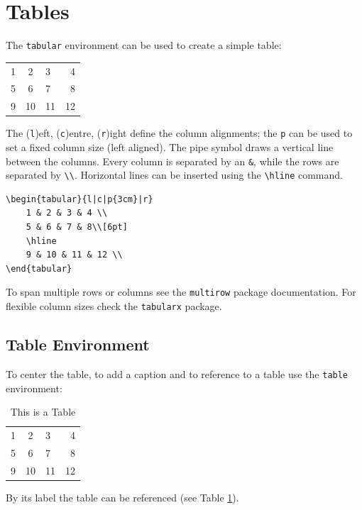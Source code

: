 \section{Tables}

The \texttt{tabular} environment can be used to create a simple table:
\begin{tabular}{l|c|p{3cm}|r}
    1 & 2 & 3 & 4 \\
    5 & 6 & 7 & 8\\[6pt]
    \hline
    9 & 10 & 11 & 12 \\
\end{tabular}

The (\texttt{l})eft, (\texttt{c})entre, (\texttt{r})ight define the column alignments; the \texttt{p} can be used to set a fixed column size (left aligned). The pipe symbol draws a vertical line between the columns. Every column is separated by an \texttt{\&}, while the rows are separated by \texttt{\textbackslash\textbackslash}. Horizontal lines can be inserted using the \texttt{\textbackslash hline} command.
\begin{verbatim}
\begin{tabular}{l|c|p{3cm}|r}
    1 & 2 & 3 & 4 \\
    5 & 6 & 7 & 8\\[6pt]
    \hline
    9 & 10 & 11 & 12 \\
\end{tabular}
\end{verbatim}

To span multiple rows or columns see the \texttt{multirow} package documentation. For flexible column sizes check the \texttt{tabularx} package.

\subsection{Table Environment}
To center the table, to add a caption and to reference to a table use the \texttt{table} environment:

\begin{table}[htbp]
    \centering
    \begin{tabular}{l|c|p{3cm}|r}
        1 & 2 & 3 & 4 \\
        5 & 6 & 7 & 8\\[6pt]
        \hline
        9 & 10 & 11 & 12 \\
    \end{tabular}
    \caption{This is a Table}
    \label{tab:firsttable}
\end{table}
By its label the table can be referenced (see Table \ref{tab:firsttable}).

